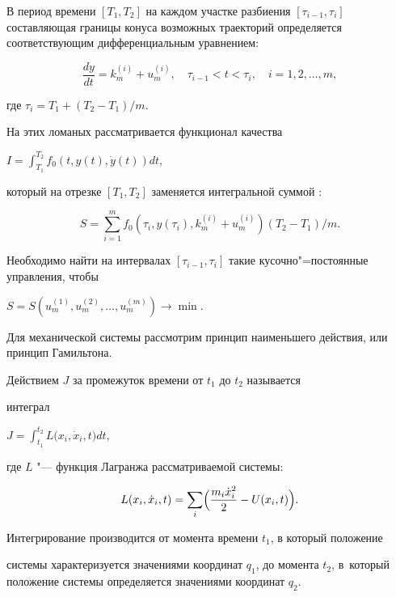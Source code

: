 В период времени $[T_1, T_2]$ на каждом участке разбиения $[\tau_{i-1}, \tau_i ]$ составляющая границы конуса возможных траекторий определяется соответствующим дифференциальным уравнением:

$$

\frac{dy}{dt}=k_m^{(i)} +u_m^{(i)}, \quad

\tau_{i-1} <t<\tau_i,\quad   i = 1, 2, \dots, m,

$$

где $\tau_i =T_1 + (T_2 -T_1)/m .$

На этих ломаных рассматривается функционал качества

$ \displaystyle

I=\int_{T_1 }^{T_2 } f_0  (t, y(t), \dot {y}(t))dt,

$

который на отрезке $[T_1, T_2]$ заменяется интегральной суммой \cite{kaledin_sukharev:NSB}:

$$

S=\sum_{i=1}^m {f_0} (\tau _i, y(\tau_i), k_m^{(i)} + u_m^{(i)}) (T_2-T_1)/m.

$$

Необходимо найти на интервалах $[\tau_{i-1}, \tau_i]$ такие кусочно"=постоянные  управления, чтобы

$

S=S( u_m^{(1)}, u_m^{(2)}, \dots, u_m^{(m)})\to \min.

$



Для механической системы рассмотрим принцип наименьшего действия, или принцип Гамильтона\cite{kaledin_sukharev:IVS}.

Действием $J$ за промежуток времени от $t_1$ до $t_2$ называется

интеграл

$ \displaystyle

J=\int_{t_1 }^{t_2 } {L(} x_i ,\dot {x}_i ,t)dt,

$

где $L$ "--- функция Лагранжа рассматриваемой системы:

$$

L(x_i, \dot {x}_i, t)=\sum_i \Bigl( \frac{m_i \dot {x}_i^2 }{2}-U(x_i ,t) \Bigr).

$$

Интегрирование производится от момента времени $t_1$, в который положение

системы характеризуется значениями координат $q_1$, до момента $t_2$, в~который положение системы определяется значениями координат $q_2$.




